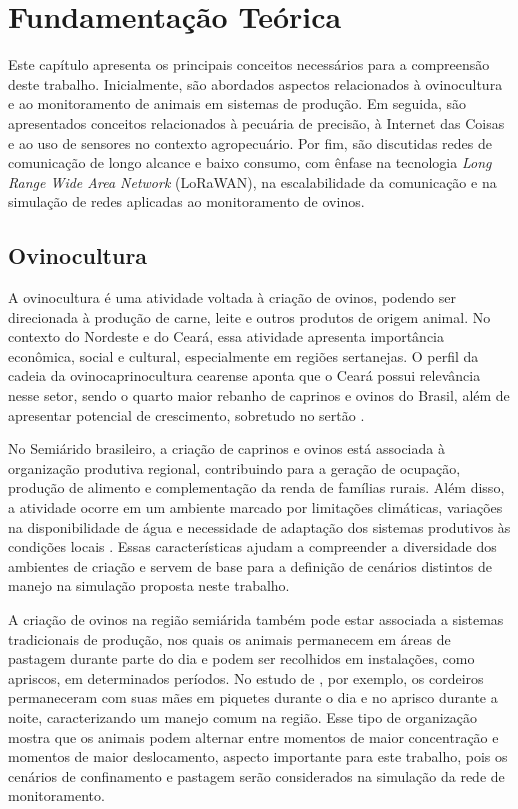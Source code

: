 \chapter{Fundamentação Teórica}
\label{cap:fundamentacao}

Este capítulo apresenta os principais conceitos necessários para a compreensão deste trabalho. Inicialmente, são abordados aspectos relacionados à ovinocultura e ao monitoramento de animais em sistemas de produção. Em seguida, são apresentados conceitos relacionados à pecuária de precisão, à Internet das Coisas e ao uso de sensores no contexto agropecuário. Por fim, são discutidas redes de comunicação de longo alcance e baixo consumo, com ênfase na tecnologia \textit{Long Range Wide Area Network} (LoRaWAN), na escalabilidade da comunicação e na simulação de redes aplicadas ao monitoramento de ovinos.

\section{Ovinocultura}
\label{sec:ovinocultura}

A ovinocultura é uma atividade voltada à criação de ovinos, podendo ser direcionada à produção de carne, leite e outros produtos de origem animal. No contexto do Nordeste e do Ceará, essa atividade apresenta importância econômica, social e cultural, especialmente em regiões sertanejas. O perfil da cadeia da ovinocaprinocultura cearense aponta que o Ceará possui relevância nesse setor, sendo o quarto maior rebanho de caprinos e ovinos do Brasil, além de apresentar potencial de crescimento, sobretudo no sertão \cite{ceara2025}.

No Semiárido brasileiro, a criação de caprinos e ovinos está associada à organização produtiva regional, contribuindo para a geração de ocupação, produção de alimento e complementação da renda de famílias rurais. Além disso, a atividade ocorre em um ambiente marcado por limitações climáticas, variações na disponibilidade de água e necessidade de adaptação dos sistemas produtivos às condições locais \cite{voltolini2011}. Essas características ajudam a compreender a diversidade dos ambientes de criação e servem de base para a definição de cenários distintos de manejo na simulação proposta neste trabalho.

A criação de ovinos na região semiárida também pode estar associada a sistemas tradicionais de produção, nos quais os animais permanecem em áreas de pastagem durante parte do dia e podem ser recolhidos em instalações, como apriscos, em determinados períodos. No estudo de , por exemplo, os cordeiros permaneceram com suas mães em piquetes durante o dia e no aprisco durante a noite, caracterizando um manejo comum na região. Esse tipo de organização mostra que os animais podem alternar entre momentos de maior concentração e momentos de maior deslocamento, aspecto importante para este trabalho, pois os cenários de confinamento e pastagem serão considerados na simulação da rede de monitoramento.

